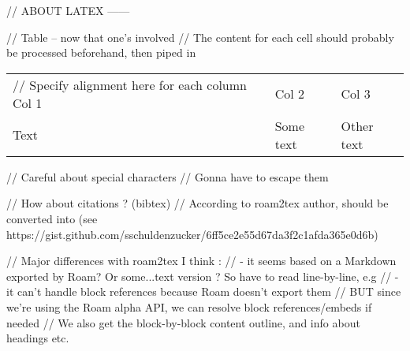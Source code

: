 // ABOUT LATEX ------

// Table -- now that one's involved
// The content for each cell should probably be processed beforehand, then piped in
\begin{tabular}{ l l l } // Specify alignment here for each column
    Col 1     & Col 2     & Col 3  \\
    Text      & Some text & Other text \\
\end{tabular}

// Careful about special characters
// Gonna have to escape them

// How about citations ? (bibtex)
// According to roam2tex author, should be converted into \cite{} (see https://gist.github.com/sschuldenzucker/6ff5ce2e55d67da3f2c1afda365e0d6b)

// Major differences with roam2tex I think :
// - it seems based on a Markdown exported by Roam? Or some...text version ? So have to read line-by-line, e.g
// - it can't handle block references because Roam doesn't export them
// BUT since we're using the Roam alpha API, we can resolve block references/embeds if needed
// We also get the block-by-block content outline, and info about headings etc.